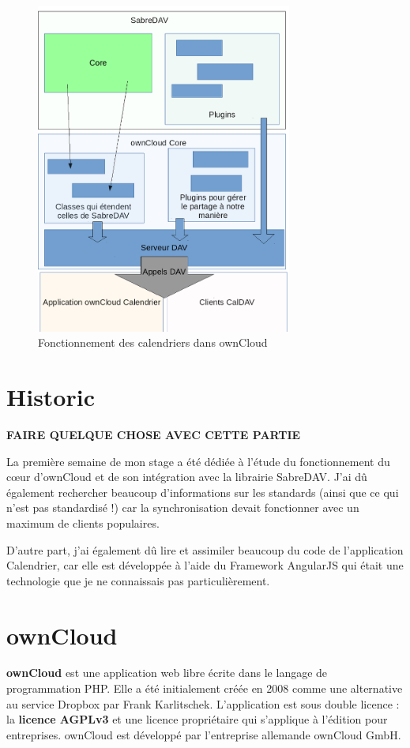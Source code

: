 \documentclass[10pt,a4paper, twoside]{report}
\begin{document}
	\begin{figure}[ht]
		\centering
		\includegraphics[width=0.75\textwidth]{images/schema.png}
		\caption{Fonctionnement des calendriers dans ownCloud}
		\label{normal_case}
	\end{figure}
	
	\section{Historic}
	\textbf{\color{red}FAIRE QUELQUE CHOSE AVEC CETTE PARTIE}
	
	La première semaine de mon stage a été dédiée à l'étude du fonctionnement du cœur d'ownCloud et de son intégration avec la librairie SabreDAV. J'ai dû également rechercher beaucoup d'informations sur les standards (ainsi que ce qui n'est pas standardisé !) car la synchronisation devait fonctionner avec un maximum de clients populaires.
	
	D'autre part, j'ai également dû lire et assimiler beaucoup du code de l'application Calendrier, car elle est développée à l'aide du Framework AngularJS qui était une technologie que je ne connaissais pas particulièrement.
	
	\section{ownCloud}
	\textbf{ownCloud} est une application web libre écrite dans le langage de programmation PHP. Elle a été initialement créée en 2008 comme une alternative au service Dropbox par Frank Karlitschek. L'application est sous double licence : la \textbf{licence AGPLv3} et une licence propriétaire qui s'applique à l'édition pour entreprises. ownCloud est développé par l'entreprise allemande ownCloud GmbH.
	\\
	
\end{document}
